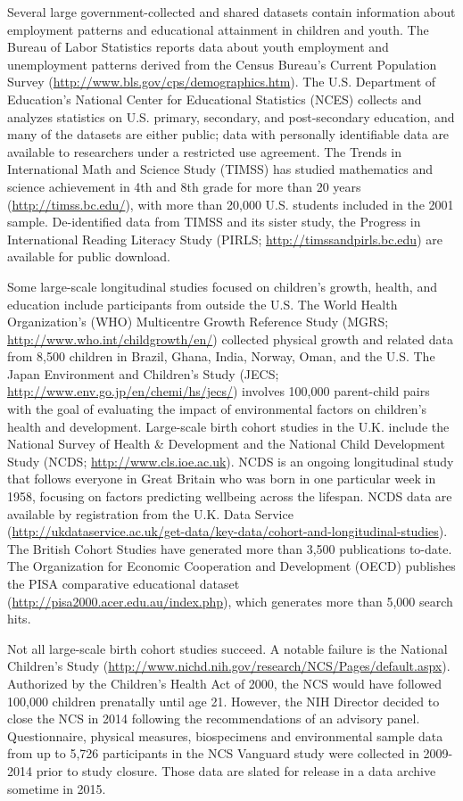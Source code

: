 \documentclass[letterpaper,man,apacite,natbib]{apa6}
\begin{document}
Several large government-collected and shared datasets contain information about employment patterns and educational attainment in children and youth.
The Bureau of Labor Statistics reports data about youth employment and unemployment patterns derived from the Census Bureau's Current Population Survey (\url{http://www.bls.gov/cps/demographics.htm}).
The U.S. Department of Education's National Center for Educational Statistics (NCES) collects and analyzes statistics on U.S. primary, secondary, and post-secondary education, and many of the datasets are either public; data with personally identifiable data are available to researchers under a restricted use agreement.
The Trends in International Math and Science Study (TIMSS) has studied mathematics and science achievement in 4th and 8th grade for more than 20 years (\url{http://timss.bc.edu/}), with more than 20,000 U.S. students included in the 2001 sample.
De-identified data from TIMSS and its sister study, the Progress in International Reading Literacy Study (PIRLS; \url{http://timssandpirls.bc.edu}) are available for public download.

Some large-scale longitudinal studies focused on children's growth, health, and education include participants from outside the U.S.
The World Health Organization's (WHO) Multicentre Growth Reference Study (MGRS; \url{http://www.who.int/childgrowth/en/}) collected physical growth and related data from 8,500 children in Brazil, Ghana, India, Norway, Oman, and the U.S.
The Japan Environment and Children's Study (JECS; \url{http://www.env.go.jp/en/chemi/hs/jecs/}) involves 100,000 parent-child pairs with the goal of evaluating the impact of environmental factors on children's health and development.
Large-scale birth cohort studies in the U.K. include the National Survey of Health \& Development and the National Child Development Study (NCDS; \url{http://www.cls.ioe.ac.uk}).
NCDS is an ongoing longitudinal study that follows everyone in Great Britain who was born in one particular week in 1958, focusing on factors predicting wellbeing across the lifespan.
NCDS data are available by registration from the U.K. Data Service (\url{http://ukdataservice.ac.uk/get-data/key-data/cohort-and-longitudinal-studies}).
The British Cohort Studies have generated more than 3,500 publications to-date.
The Organization for Economic Cooperation and Development (OECD) publishes the PISA comparative educational dataset (\url{http://pisa2000.acer.edu.au/index.php}), which generates more than 5,000 search hits.

Not all large-scale birth cohort studies succeed.
A notable failure is the National Children's Study (\url{http://www.nichd.nih.gov/research/NCS/Pages/default.aspx}).
Authorized by the Children's Health Act of 2000, the NCS would have followed 100,000 children prenatally until age 21.
However, the NIH Director decided to close the NCS in 2014 following the recommendations of an advisory panel. 
Questionnaire, physical measures, biospecimens and environmental sample data from up to 5,726 participants in the NCS Vanguard study were collected in 2009-2014 prior to study closure.
Those data are slated for release in a data archive sometime in 2015.
\end{document}
